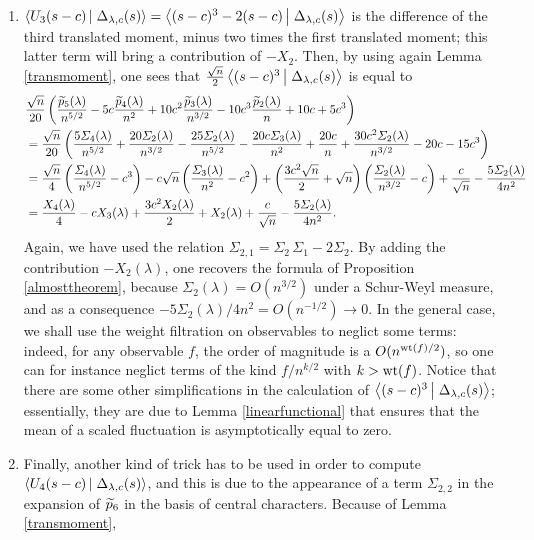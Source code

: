 \documentclass[10pt]{amsart}
\begin{document}
\begin{examples}
\begin{enumerate}
\item[$k=3$.] $\scal{U_{3}(s-c)}{\Delta_{\lambda,c}(s)}=\scal{(s-c)^{3}-2(s-c)}{\Delta_{\lambda,c}(s)}$ is the difference of the third translated moment, minus two times the first translated moment; this latter term will bring a contribution of $-X_{2}$. Then, by using again Lemma \ref{transmoment}, one sees that $\frac{\sqrt{n}}{2}\scal{(s-c)^{3}}{\Delta_{\lambda,c}(s)}$ is equal to
\begin{align*}
&\frac{\sqrt{n}}{20}\left(\frac{\widetilde{p}_{5}(\lambda)}{n^{5/2}}-5c\frac{\widetilde{p}_{4}(\lambda)}{n^{2}}+10c^{2}\frac{\widetilde{p}_{3}(\lambda)}{n^{3/2}}-10c^{3}\frac{\widetilde{p}_{2}(\lambda)}{n}+10c+5c^{3}\right)\\
&=\frac{\sqrt{n}}{20}\left(\frac{5\varSigma_{4}(\lambda)}{n^{5/2}}+\frac{20\varSigma_{2}(\lambda)}{n^{3/2}}-\frac{25\varSigma_{2}(\lambda)}{n^{5/2}}-\frac{20c\varSigma_{3}(\lambda)}{n^{2}}+\frac{20c}{n}+\frac{30c^{2}\varSigma_{2}(\lambda)}{n^{3/2}}-20c-15c^{3}\right)\\
&=\frac{\sqrt{n}}{4}\left(\frac{\varSigma_{4}(\lambda)}{n^{5/2}}-c^{3}\right)-c\sqrt{n}\left(\frac{\varSigma_{3}(\lambda)}{n^{2}}-c^{2}\right)+\left(\frac{3c^{2}\sqrt{n}}{2}+\sqrt{n}\right)\left(\frac{\varSigma_{2}(\lambda)}{n^{3/2}}-c\right)+\frac{c}{\sqrt{n}}-\frac{5\varSigma_{2}(\lambda)}{4n^{2}}\\
&=\frac{X_{4}(\lambda)}{4}-cX_{3}(\lambda)+\frac{3c^{2}X_{2}(\lambda)}{2}+X_{2}(\lambda)+\frac{c}{\sqrt{n}}-\frac{5\varSigma_{2}(\lambda)}{4n^{2}}.
\end{align*}
Again, we have used the relation $\varSigma_{2,1}=\varSigma_{2}\,\varSigma_{1}-2\varSigma_{2}$. By adding the contribution $-X_{2}(\lambda)$, one recovers the formula of Proposition \ref{almosttheorem}, because $\varSigma_{2}(\lambda)=O(n^{3/2})$ under a Schur-Weyl measure, and as a consequence $-5\varSigma_{2}(\lambda)/4n^{2}=O(n^{-1/2}) \to 0$. In the general case, we shall use the weight filtration on observables to neglict some terms: indeed, for any observable $f$, the order of magnitude is a $O(n^{\mathrm{wt}(f)/2})$, so one can for instance neglict terms of the kind $f/n^{k/2}$ with $k>\mathrm{wt}(f)$. Notice that there are some other simplifications in the calculation of $\scal{(s-c)^{3}}{\Delta_{\lambda,c}(s)}$; essentially, they are due to Lemma \ref{linearfunctional} that ensures that the mean of a scaled fluctuation is asymptotically equal to zero.\vspace{2mm}
\item[$k=4$.] Finally, another kind of trick has to be used in order to compute $\scal{U_{4}(s-c)}{\Delta_{\lambda,c}(s)}$, and this is due to the appearance of a term $\varSigma_{2,2}$ in the expansion of $\widetilde{p}_{6}$ in the basis of central characters. Because of Lemma \ref{transmoment},

\end{enumerate}
\end{examples}
\end{document}

